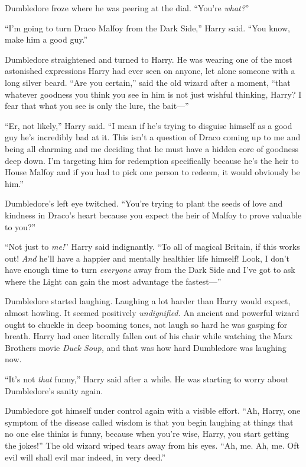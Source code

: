 Dumbledore froze where he was peering at the dial. “You’re \emph{what?}”

“I’m going to turn Draco Malfoy from the Dark Side,” Harry said. “You know, make him a good guy.”

Dumbledore straightened and turned to Harry. He was wearing one of the most astonished expressions Harry had ever seen on anyone, let alone someone with a long silver beard. “Are you certain,” said the old wizard after a moment, “that whatever goodness you think you see in him is not just wishful thinking, Harry? I fear that what you see is only the lure, the bait—”

“Er, not likely,” Harry said. “I mean if he’s trying to disguise himself as a good guy he’s incredibly bad at it. This isn’t a question of Draco coming up to me and being all charming and me deciding that he must have a hidden core of goodness deep down. I’m targeting him for redemption specifically because he’s the heir to House Malfoy and if you had to pick one person to redeem, it would obviously be him.”

Dumbledore’s left eye twitched. “You’re trying to plant the seeds of love and kindness in Draco’s heart because you expect the heir of Malfoy to prove valuable to you?”

“Not just to \emph{me!}” Harry said indignantly. “To all of magical Britain, if this works out! \emph{And} he’ll have a happier and mentally healthier life himself! Look, I don’t have enough time to turn \emph{everyone} away from the Dark Side and I’ve got to ask where the Light can gain the most advantage the fastest—”

Dumbledore started laughing. Laughing a lot harder than Harry would expect, almost howling. It seemed positively \emph{undignified.} An ancient and powerful wizard ought to chuckle in deep booming tones, not laugh so hard he was gasping for breath. Harry had once literally fallen out of his chair while watching the Marx Brothers movie \emph{Duck Soup,} and that was how hard Dumbledore was laughing now.

“It’s not \emph{that} funny,” Harry said after a while. He was starting to worry about Dumbledore’s sanity again.

Dumbledore got himself under control again with a visible effort. “Ah, Harry, one symptom of the disease called wisdom is that you begin laughing at things that no one else thinks is funny, because when you’re wise, Harry, you start getting the jokes!” The old wizard wiped tears away from his eyes. “Ah, me. Ah, me. Oft evil will shall evil mar indeed, in very deed.”

